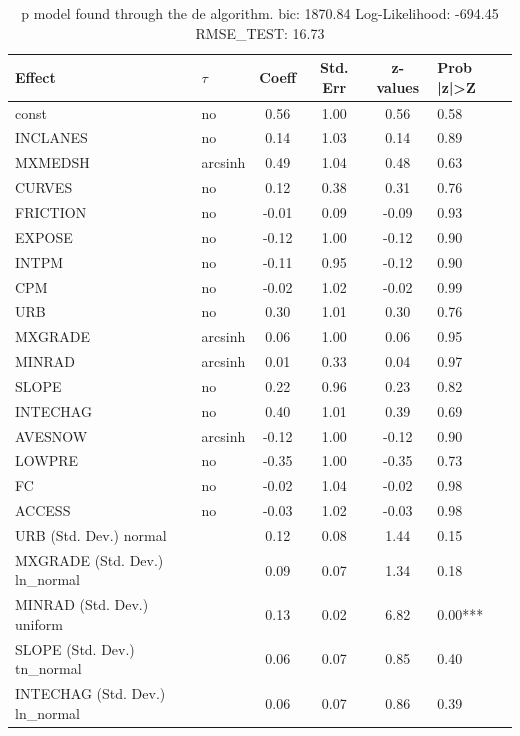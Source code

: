 \begin{table}
	\caption{p model found through the de algorithm. bic: 1870.84 Log-Likelihood: -694.45 RMSE_TEST: 16.73}
	\begin{center}
		\begin{tabular}{|l|l|c|c|c|l|}
			\hline
			Effect & $\tau$ & Coeff & Std. Err & z-values & Prob |z|>Z \\
			\hline
			const & no & 0.56 & 1.00 & 0.56 & 0.58 \\
			\hline
			INCLANES & no & 0.14 & 1.03 & 0.14 & 0.89 \\
			\hline
			MXMEDSH & arcsinh & 0.49 & 1.04 & 0.48 & 0.63 \\
			\hline
			CURVES & no & 0.12 & 0.38 & 0.31 & 0.76 \\
			\hline
			FRICTION & no & -0.01 & 0.09 & -0.09 & 0.93 \\
			\hline
			EXPOSE & no & -0.12 & 1.00 & -0.12 & 0.90 \\
			\hline
			INTPM & no & -0.11 & 0.95 & -0.12 & 0.90 \\
			\hline
			CPM & no & -0.02 & 1.02 & -0.02 & 0.99 \\
			\hline
			URB & no & 0.30 & 1.01 & 0.30 & 0.76 \\
			\hline
			MXGRADE & arcsinh & 0.06 & 1.00 & 0.06 & 0.95 \\
			\hline
			MINRAD & arcsinh & 0.01 & 0.33 & 0.04 & 0.97 \\
			\hline
			SLOPE & no & 0.22 & 0.96 & 0.23 & 0.82 \\
			\hline
			INTECHAG & no & 0.40 & 1.01 & 0.39 & 0.69 \\
			\hline
			AVESNOW & arcsinh & -0.12 & 1.00 & -0.12 & 0.90 \\
			\hline
			LOWPRE & no & -0.35 & 1.00 & -0.35 & 0.73 \\
			\hline
			FC & no & -0.02 & 1.04 & -0.02 & 0.98 \\
			\hline
			ACCESS & no & -0.03 & 1.02 & -0.03 & 0.98 \\
			\hline
			URB (Std. Dev.) normal &  & 0.12 & 0.08 & 1.44 & 0.15 \\
			\hline
			MXGRADE (Std. Dev.) ln_normal &  & 0.09 & 0.07 & 1.34 & 0.18 \\
			\hline
			MINRAD (Std. Dev.) uniform &  & 0.13 & 0.02 & 6.82 & 0.00*** \\
			\hline
			SLOPE (Std. Dev.) tn_normal &  & 0.06 & 0.07 & 0.85 & 0.40 \\
			\hline
			INTECHAG (Std. Dev.) ln_normal &  & 0.06 & 0.07 & 0.86 & 0.39 \\

\end{tabular}
\end{center}
\end{table}
